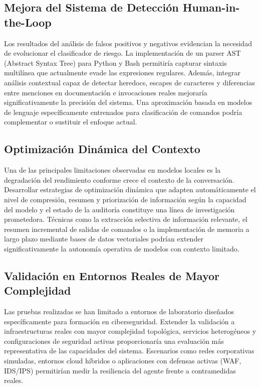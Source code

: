 \subsection{Mejora del Sistema de Detección Human-in-the-Loop}

Los resultados del análisis de falsos positivos y negativos evidencian la necesidad de evolucionar el clasificador de riesgo. La implementación de un parser AST (Abstract Syntax Tree) para Python y Bash permitiría capturar sintaxis multilínea que actualmente evade las expresiones regulares. Además, integrar análisis contextual capaz de detectar heredocs, escapes de caracteres y diferencias entre menciones en documentación e invocaciones reales mejoraría significativamente la precisión del sistema. Una aproximación basada en modelos de lenguaje específicamente entrenados para clasificación de comandos podría complementar o sustituir el enfoque actual.

\subsection{Optimización Dinámica del Contexto}

Una de las principales limitaciones observadas en modelos locales es la degradación del rendimiento conforme crece el contexto de la conversación. Desarrollar estrategias de optimización dinámica que adapten automáticamente el nivel de compresión, resumen y priorización de información según la capacidad del modelo y el estado de la auditoría constituye una línea de investigación prometedora. Técnicas como la extracción selectiva de información relevante, el resumen incremental de salidas de comandos o la implementación de memoria a largo plazo mediante bases de datos vectoriales podrían extender significativamente la autonomía operativa de modelos con contexto limitado.

\subsection{Validación en Entornos Reales de Mayor Complejidad}

Las pruebas realizadas se han limitado a entornos de laboratorio diseñados específicamente para formación en ciberseguridad. Extender la validación a infraestructuras reales con mayor complejidad topológica, servicios heterogéneos y configuraciones de seguridad activas proporcionaría una evaluación más representativa de las capacidades del sistema. Escenarios como redes corporativas simuladas, entornos cloud híbridos o aplicaciones con defensas activas (WAF, IDS/IPS) permitirían medir la resiliencia del agente frente a contramedidas reales.

